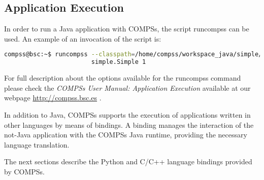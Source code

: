 \subsection{Application Execution}
In order to run a Java application with COMPSs, the script runcompss can be used. An example of an invocation of the script is:

\begin{lstlisting}[language=bash]
compss@bsc:~$ runcompss --classpath=/home/compss/workspace_java/simple/jar/simple.jar 
                        simple.Simple 1
\end{lstlisting}

For full description about the options available for the runcompss command please check the \textit{COMPSs User Manual: Application
Execution} available at our webpage \url{http://compss.bsc.es} . 
\newline
~ \newline

In addition to Java, COMPSs supports the execution of applications written in other languages by 
means of bindings. A binding manages the interaction of the not-Java application with the COMPSs 
Java runtime, providing the necessary language translation.

The next sections describe the Python and C/C++ language bindings provided by COMPSs.